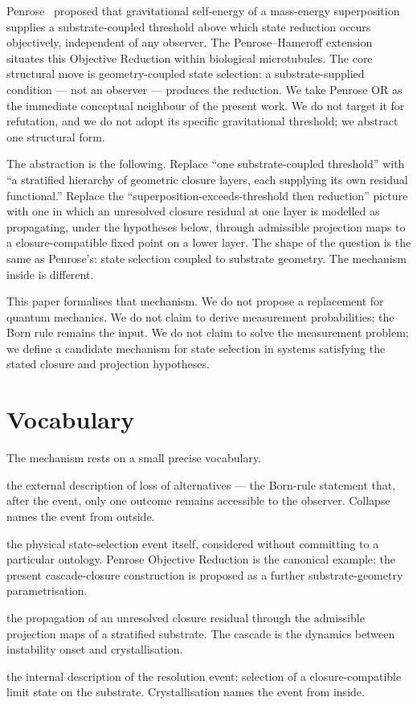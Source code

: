 \documentclass[11pt]{article}
\theoremstyle{definition}
\begin{document}
Penrose~\cite{Penrose1996} proposed that gravitational self-energy of
a mass-energy superposition supplies a substrate-coupled threshold
above which state reduction occurs objectively, independent of any
observer. The Penrose--Hameroff extension~\cite{PenroseHameroff1996}
situates this Objective Reduction within biological microtubules. The
core structural move is geometry-coupled state selection: a
substrate-supplied condition --- not an observer --- produces the
reduction. We take Penrose OR as the immediate conceptual neighbour of
the present work. We do not target it for refutation, and we do not
adopt its specific gravitational threshold; we abstract one
structural form.

The abstraction is the following. Replace ``one substrate-coupled
threshold'' with ``a stratified hierarchy of geometric closure layers,
each supplying its own residual functional.'' Replace the
``superposition-exceeds-threshold then reduction'' picture with one
in which an unresolved closure residual at one layer is modelled as
propagating, under the hypotheses below, through admissible
projection maps to a closure-compatible fixed point on a lower layer.
The shape of the question is the same as Penrose's: state selection
coupled to substrate geometry. The mechanism inside is different.

This paper formalises that mechanism. We do not propose a replacement
for quantum mechanics. We do not claim to derive measurement
probabilities; the Born rule remains the input. We do not claim to
solve the measurement problem; we define a candidate mechanism for
state selection in systems satisfying the stated closure and
projection hypotheses.

\section{Vocabulary}\label{sec:vocabulary}

The mechanism rests on a small precise vocabulary.

\begin{description}[leftmargin=2.5em, style=nextline]
\item[Collapse] the external description of loss of alternatives ---
the Born-rule statement that, after the event, only one outcome
remains accessible to the observer. Collapse names the event from
outside.
\item[Reduction] the physical state-selection event itself, considered
without committing to a particular ontology. Penrose Objective
Reduction is the canonical example; the present cascade-closure
construction is proposed as a further substrate-geometry
parametrisation.
\item[Cascade] the propagation of an unresolved closure residual
through the admissible projection maps of a stratified substrate.
The cascade is the dynamics between instability onset and
crystallisation.
\item[Crystallisation] the internal description of the resolution
event: selection of a closure-compatible limit state on the
substrate. Crystallisation names the event from inside.
\end{description}
\end{document}
